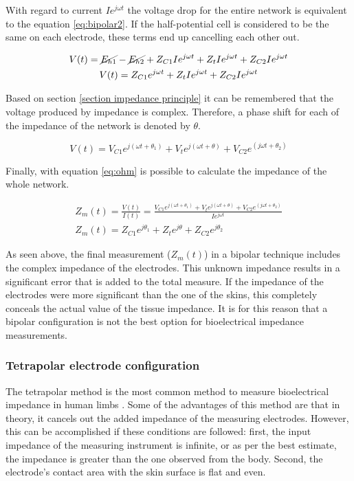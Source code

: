With regard to current $Ie^{j \omega t}$ the voltage drop for the entire network is equivalent to the equation \ref{eq:bipolar2}. If the half-potential cell is considered to be the same on each electrode, these terms end up cancelling each other out. 

\begin{gather}
	\label{eq:bipolar2}
	V(t) = \cancel{E_{h1}} - \cancel{E_{h2}} + Z_{C1}I e^{j \omega t} +Z_t I e^{j \omega t} +Z_{C2}I e^{j \omega t}
	\\
	\label{eq:bipolar3}
	V(t) = Z_{C1}e^{j \omega t} +Z_t I e^{j \omega t} +Z_{C2}I e^{j \omega t}
\end{gather}

Based on section \ref{section impedance principle} it can be remembered that the voltage produced by impedance is complex. Therefore, a phase shift for each of the impedance of the network is denoted by $\theta$.

\begin{equation}
\label{eq:bipolar4}
V(t) = V_{C1} e^{j(\omega t + \theta_1)} + V_t e^{j( \omega t + \theta)} +V_{C2} e^{(j \omega t + \theta_2)}
\end{equation} 

Finally, with equation \ref{eq:ohm} is possible to calculate the impedance of the whole network.

\begin{gather}
	\label{eq:bipolar5}
	Z_m(t) =\frac{V(t)}{I(t)} = \frac{V_{C1} e^{j( \omega t + \theta_1)} + V_t e^{j( \omega t + \theta)} +V_{C2} e^{(j \omega t + \theta_2)}}{I e^{j \omega t}} \\
	Z_m(t) = Z_{C1}e^{j\theta_1} + Z_{t}e^{j\theta} + Z_{C2}e^{j\theta_2}
\end{gather} 

As seen above, the final measurement ($Z_m(t)$) in a bipolar technique includes the complex impedance of the electrodes. This unknown impedance results in a significant error that is added to the total measure. If the impedance of the electrodes were more significant than the one of the skins, this completely conceals the actual value of the tissue impedance. It is for this reason that a bipolar configuration is not the best option for bioelectrical impedance measurements. 

\subsubsection{Tetrapolar electrode configuration}
The tetrapolar method is the most common method to measure bioelectrical impedance in human limbs \cite{nyboer1974blood, costeloe1980continuous, yamakoshi1980limb, yamamoto1992impedance}. Some of the advantages of this method are that in theory, it cancels out the added impedance of the measuring electrodes. However, this can be accomplished if these conditions are followed: first, the input impedance of the measuring instrument is infinite, or as per the best estimate, the impedance is greater than the one observed from the body. Second, the electrode's contact area with the skin surface is flat and even.

